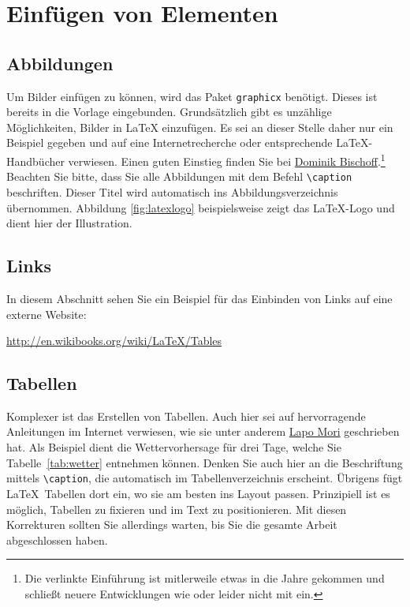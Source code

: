 \documentclass{scrbook}
\begin{document}
\section{Einfügen von Elementen}
\label{sec:gleitumgebungen}

\subsection{Abbildungen}
Um Bilder einfügen zu können, wird das Paket \texttt{graphicx}  benötigt. Dieses ist bereits in die Vorlage eingebunden. Grundsätzlich gibt es unzählige Möglichkeiten,  Bilder in \LaTeX{} einzufügen. Es sei an dieser Stelle daher nur ein Beispiel gegeben und auf eine Internetrecherche oder entsprechende \LaTeX-Handbücher verwiesen. Einen guten Einstieg finden Sie bei \href{https://mirrors.ctan.org/info/l2picfaq/german/l2picfaq.pdf}{\color{blue} Dominik Bischoff}.\footnote{Die verlinkte Einführung ist mitlerweile etwas in die Jahre gekommen und schließt neuere Entwicklungen wie  oder  leider nicht mit ein.} 
Beachten Sie bitte, dass Sie alle Abbildungen mit dem Befehl \verb|\caption| beschriften. Dieser Titel wird automatisch ins Abbildungsverzeichnis übernommen. Abbildung \ref{fig:latexlogo} beispielsweise zeigt das \LaTeX-Logo und dient hier der Illustration.


\subsection{Links}
In diesem Abschnitt sehen Sie ein Beispiel für das Einbinden von Links auf eine externe Website:

\begin{center}
	\href{http://en.wikibooks.org/wiki/LaTeX/Tables}{\color{blue} http://en.wikibooks.org/wiki/LaTeX/Tables}
\end{center}
 
\subsection{Tabellen}
Komplexer ist das Erstellen von Tabellen. Auch hier sei auf hervorragende Anleitungen im Internet verwiesen, wie sie unter anderem \href{https://www.tug.org/pracjourn/2007-1/mori/mori.pdf}{\color{blue} Lapo Mori} geschrieben hat. Als Beispiel dient die Wettervorhersage für drei Tage, welche Sie Tabelle~\ref{tab:wetter} entnehmen können. Denken Sie auch hier an die Beschriftung mittels \verb|\caption|, die automatisch im Tabellenverzeichnis erscheint. Übrigens fügt \LaTeX\ Tabellen dort ein, wo sie am besten ins Layout passen. Prinzipiell ist es möglich, Tabellen zu fixieren und im Text zu positionieren. Mit diesen Korrekturen sollten Sie allerdings warten, bis Sie die gesamte Arbeit abgeschlossen haben.
\end{document}
